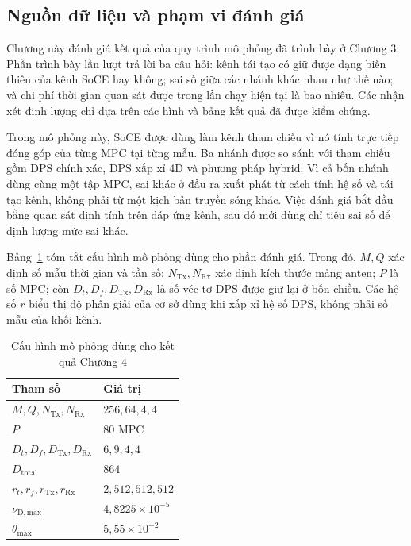 \setcounter{section}{4}
\label{chap:simulation_results}

\subsection{Nguồn dữ liệu và phạm vi đánh giá}
\label{subsec:ch4_data_scope}

Chương này đánh giá kết quả của quy trình mô phỏng đã trình bày ở Chương 3. Phần trình bày lần lượt trả lời ba câu hỏi: kênh tái tạo có giữ được dạng biến thiên của kênh SoCE hay không; sai số giữa các nhánh khác nhau như thế nào; và chi phí thời gian quan sát được trong lần chạy hiện tại là bao nhiêu. Các nhận xét định lượng chỉ dựa trên các hình và bảng kết quả đã được kiểm chứng.

Trong mô phỏng này, SoCE được dùng làm kênh tham chiếu vì nó tính trực tiếp đóng góp của từng MPC tại từng mẫu. Ba nhánh được so sánh với tham chiếu gồm DPS chính xác, DPS xấp xỉ 4D và phương pháp hybrid. Vì cả bốn nhánh dùng cùng một tập MPC, sai khác ở đầu ra xuất phát từ cách tính hệ số và tái tạo kênh, không phải từ một kịch bản truyền sóng khác. Việc đánh giá bắt đầu bằng quan sát định tính trên đáp ứng kênh, sau đó mới dùng chỉ tiêu sai số để định lượng mức sai khác.

Bảng~\ref{tab:ch4_simulation_config} tóm tắt cấu hình mô phỏng dùng cho phần đánh giá. Trong đó, \(M,Q\) xác định số mẫu thời gian và tần số; \(N_{\mathrm{Tx}},N_{\mathrm{Rx}}\) xác định kích thước mảng anten; \(P\) là số MPC; còn \(D_t,D_f,D_{\mathrm{Tx}},D_{\mathrm{Rx}}\) là số véc-tơ DPS được giữ lại ở bốn chiều. Các hệ số \(r\) biểu thị độ phân giải của cơ sở dùng khi xấp xỉ hệ số DPS, không phải số mẫu của khối kênh.

\begin{table}[H]
    \centering
    \small
    \caption{Cấu hình mô phỏng dùng cho kết quả Chương 4}
    \label{tab:ch4_simulation_config}
    \begin{tabular}{ll}
        \toprule
        Tham số & Giá trị \\
        \midrule
        \(M,Q,N_{\mathrm{Tx}},N_{\mathrm{Rx}}\) & \(256,64,4,4\) \\
        \(P\) & \(80\) MPC \\
        \(D_t,D_f,D_{\mathrm{Tx}},D_{\mathrm{Rx}}\) & \(6,9,4,4\) \\
        \(D_{\mathrm{total}}\) & \(864\) \\
        \(r_t,r_f,r_{\mathrm{Tx}},r_{\mathrm{Rx}}\) & \(2,512,512,512\) \\
        \(\nu_{\mathrm{D,max}}\) & \(4{,}8225\times10^{-5}\) \\
        \(\theta_{\max}\) & \(5{,}55\times10^{-2}\) \\
        \bottomrule
    \end{tabular}
\end{table}

